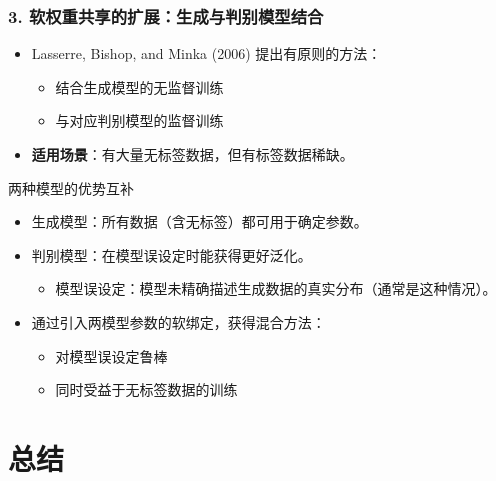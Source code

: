 \documentclass[t,aspectratio=169]{beamer} %
\begin{document}
\begin{frame}
    \frametitle{3. 软权重共享的扩展：生成与判别模型结合}
    \begin{itemize}
        \item Lasserre, Bishop, and Minka (2006) 提出\alert{有原则的方法}：
        \begin{itemize}
            \item 结合\alert{生成模型}的无监督训练
            \item 与对应\alert{判别模型}的监督训练
        \end{itemize}
        \item \textbf{适用场景}：有大量\alert{无标签数据}，但\alert{有标签数据稀缺}。
    \end{itemize}
    \begin{block}{两种模型的优势互补}
        \begin{itemize}
            \item \alert{生成模型}：所有数据（含无标签）都可用于确定参数。
            \item \alert{判别模型}：在\alert{模型误设定}时能获得更好泛化。
            \begin{itemize}
                \item 模型误设定：模型未精确描述生成数据的真实分布（通常是这种情况）。
            \end{itemize}
        \end{itemize}
    \end{block}
    \begin{itemize}
        \item 通过引入两模型参数的\alert{软绑定}，获得\alert{混合方法}：
        \begin{itemize}
            \item 对模型误设定\alert{鲁棒}
            \item 同时受益于\alert{无标签数据}的训练
        \end{itemize}
    \end{itemize}
\end{frame}

\section{总结}
\end{document}
